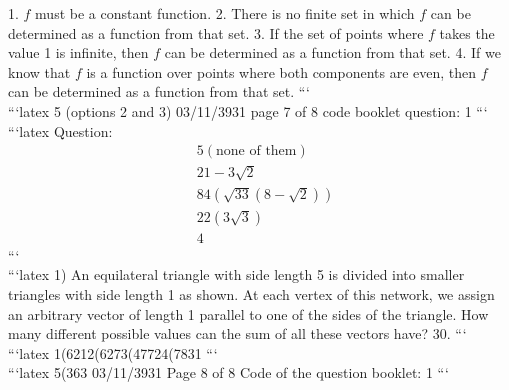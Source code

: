 1. \( f \) must be a constant function. 
2. There is no finite set in which \( f \) can be determined as a function from that set. 
3. If the set of points where \( f \) takes the value 1 is infinite, then \( f \) can be determined as a function from that set. 
4. If we know that \( f \) is a function over points where both components are even, then \( f \) can be determined as a function from that set.
```
\\
```latex
5 (options 2 and 3) 
03/11/3931 page 7 of 8 code booklet question: 1
```
\\
```latex
Question:
\begin{align*}
&5 \left( \text{none of them} \right) \\
&21 - 3\sqrt{2} \\
&84 \left( \sqrt{33} \left( 8 - \sqrt{2} \right) \right) \\
&22 \left( 3\sqrt{3} \right) \\
&4
\end{align*}
```
\\
```latex
1) An equilateral triangle with side length 5 is divided into smaller triangles with side length 1 as shown. At each vertex of this network, we assign an arbitrary vector of length 1 parallel to one of the sides of the triangle. How many different possible values can the sum of all these vectors have? 30.
```
\\
```latex
1(6212(6273(47724(7831
```
\\
```latex
5(363 
03/11/3931 Page 8 of 8 Code of the question booklet: 1
```
\\
